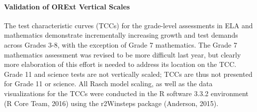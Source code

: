 \documentclass[]{article}
\let\oldparagraph\paragraph
\renewcommand{\paragraph}[1]{\oldparagraph{#1}\mbox{}}
\begin{document}
\paragraph{Validation of ORExt Vertical
Scales}\label{validation-of-orext-vertical-scales}

The test characteristic curves (TCCs) for the grade-level assessments in
ELA and mathematics demonstrate incrementally increasing growth and test
demands across Grades 3-8, with the exception of Grade 7 mathematics.
The Grade 7 mathematics assessment was revised to be more difficult last
year, but clearly more elaboration of this effort is needed to address
its location on the TCC. Grade 11 and science tests are not vertically
scaled; TCCs are thus not presented for Grade 11 or science. All Rasch
model scaling, as well as the data visualizations for the TCCs were
conducted in the R software 3.3.2 environment (R Core Team, 2016) using
the r2Winsteps package (Anderson, 2015). \FloatBarrier
\end{document}
